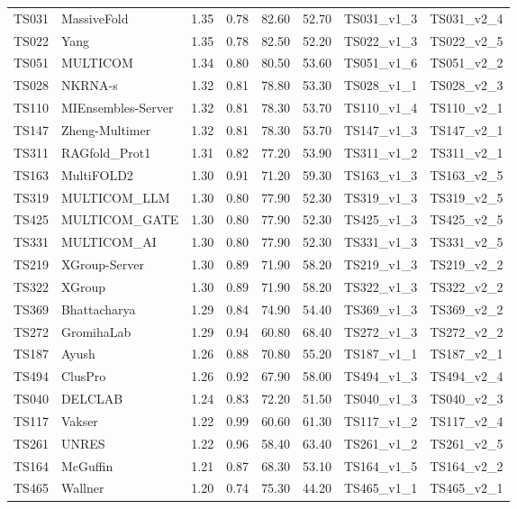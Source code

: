 \begin{longtable}{llllllll}
TS031 & MassiveFold & 1.35 & 0.78 & 82.60 & 52.70 & TS031\_v1\_3 & TS031\_v2\_4 \\ 
TS022 & Yang & 1.35 & 0.78 & 82.50 & 52.20 & TS022\_v1\_3 & TS022\_v2\_5 \\ 
TS051 & MULTICOM & 1.34 & 0.80 & 80.50 & 53.60 & TS051\_v1\_6 & TS051\_v2\_2 \\ 
TS028 & NKRNA-s & 1.32 & 0.81 & 78.80 & 53.30 & TS028\_v1\_1 & TS028\_v2\_3 \\ 
TS110 & MIEnsembles-Server & 1.32 & 0.81 & 78.30 & 53.70 & TS110\_v1\_4 & TS110\_v2\_1 \\ 
TS147 & Zheng-Multimer & 1.32 & 0.81 & 78.30 & 53.70 & TS147\_v1\_3 & TS147\_v2\_1 \\ 
TS311 & RAGfold\_Prot1 & 1.31 & 0.82 & 77.20 & 53.90 & TS311\_v1\_2 & TS311\_v2\_1 \\ 
TS163 & MultiFOLD2 & 1.30 & 0.91 & 71.20 & 59.30 & TS163\_v1\_3 & TS163\_v2\_5 \\ 
TS319 & MULTICOM\_LLM & 1.30 & 0.80 & 77.90 & 52.30 & TS319\_v1\_3 & TS319\_v2\_5 \\ 
TS425 & MULTICOM\_GATE & 1.30 & 0.80 & 77.90 & 52.30 & TS425\_v1\_3 & TS425\_v2\_5 \\ 
TS331 & MULTICOM\_AI & 1.30 & 0.80 & 77.90 & 52.30 & TS331\_v1\_3 & TS331\_v2\_5 \\ 
TS219 & XGroup-Server & 1.30 & 0.89 & 71.90 & 58.20 & TS219\_v1\_3 & TS219\_v2\_2 \\ 
TS322 & XGroup & 1.30 & 0.89 & 71.90 & 58.20 & TS322\_v1\_3 & TS322\_v2\_2 \\ 
TS369 & Bhattacharya & 1.29 & 0.84 & 74.90 & 54.40 & TS369\_v1\_3 & TS369\_v2\_2 \\ 
TS272 & GromihaLab & 1.29 & 0.94 & 60.80 & 68.40 & TS272\_v1\_3 & TS272\_v2\_2 \\ 
TS187 & Ayush & 1.26 & 0.88 & 70.80 & 55.20 & TS187\_v1\_1 & TS187\_v2\_1 \\ 
TS494 & ClusPro & 1.26 & 0.92 & 67.90 & 58.00 & TS494\_v1\_3 & TS494\_v2\_4 \\ 
TS040 & DELCLAB & 1.24 & 0.83 & 72.20 & 51.50 & TS040\_v1\_3 & TS040\_v2\_3 \\ 
TS117 & Vakser & 1.22 & 0.99 & 60.60 & 61.30 & TS117\_v1\_2 & TS117\_v2\_4 \\ 
TS261 & UNRES & 1.22 & 0.96 & 58.40 & 63.40 & TS261\_v1\_2 & TS261\_v2\_5 \\ 
TS164 & McGuffin & 1.21 & 0.87 & 68.30 & 53.10 & TS164\_v1\_5 & TS164\_v2\_2 \\ 
TS465 & Wallner & 1.20 & 0.74 & 75.30 & 44.20 & TS465\_v1\_1 & TS465\_v2\_1 \\ 

\end{longtable}
